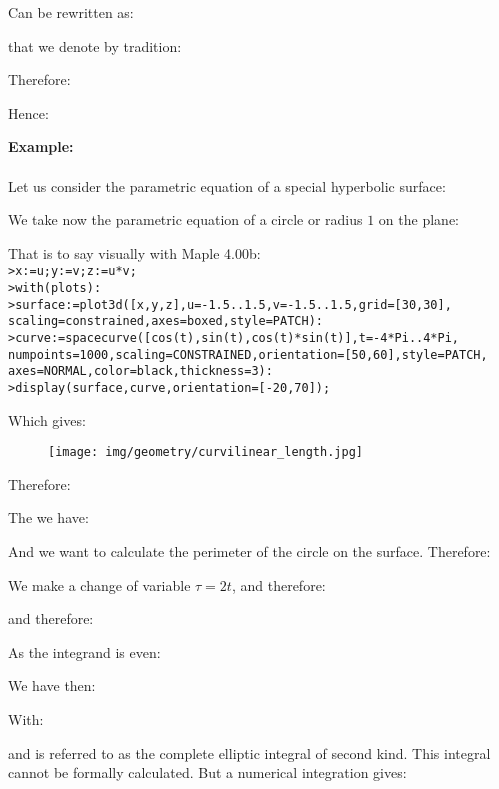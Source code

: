 	Can be rewritten as:
	
	that we denote by tradition:
	
	Therefore:
	
	Hence:
	
	
	\pagebreak
	\begin{tcolorbox}[colframe=black,colback=white,sharp corners]
	\textbf{{\Large {}}Example:}\\\\
	Let us consider the parametric equation of a special hyperbolic surface:
	
	We take now the parametric equation of a circle or radius $1$ on the plane:
	
	That is to say visually with Maple 4.00b:\\
	
	\texttt{>x:=u;y:=v;z:=u*v;\\
	>with(plots):\\
	>surface:=plot3d([x,y,z],u=-1.5..1.5,v=-1.5..1.5,grid=[30,30],\\
	scaling=constrained,axes=boxed,style=PATCH):\\
	>curve:=spacecurve([cos(t),sin(t),cos(t)*sin(t)],t=-4*Pi..4*Pi,\\
	numpoints=1000,scaling=CONSTRAINED,orientation=[50,60],style=PATCH,\\
	axes=NORMAL,color=black,thickness=3):\\
	>display(surface,curve,orientation=[-20,70]);
	}
	
	Which gives:
	\begin{figure}[H]
		\centering
		\texttt{[image: img/geometry/curvilinear\_length.jpg]}
	\end{figure}
	\end{tcolorbox}
	
	\begin{tcolorbox}[colframe=black,colback=white,sharp corners]
	Therefore:
	
	The we have:
	
	And we want to calculate the perimeter of the circle on the surface. Therefore:
	
	We make a change of variable $\tau=2t$, and therefore:
	
	and therefore:
	
	\end{tcolorbox}
	
	\begin{tcolorbox}[colframe=black,colback=white,sharp corners]
	As the integrand is even:
	
	We have then:
		
	With:
	
	and is referred to as the complete elliptic integral of second kind. 	This integral cannot be formally calculated. But a numerical integration gives:
	
	\end{tcolorbox}
	
